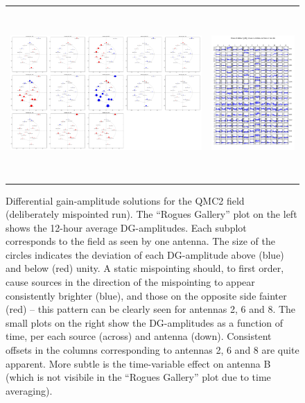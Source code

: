 \documentclass{aps2010} \special{papersize=8.5in,11in}
\begin{document}
\begin{figure}
\begin{tabular}{@{}cc@{}}
\includegraphics[height=6.5cm]{figures-meqtrees/dE_ant_gallery} &
\includegraphics[height=6.5cm,clip=true,trim=0cm 1cm 0cm 2cm]{figures-meqtrees/dE_mean} 
\end{tabular}
\caption{\label{fig:rogues}Differential gain-amplitude solutions for the QMC2 field (deliberately mispointed run). The ``Rogues Gallery'' plot on the left shows the 12-hour average DG-amplitudes. Each subplot corresponds to the field as seen by one antenna. The size of the circles indicates the deviation of each DG-amplitude above (blue) and below (red) unity. A static mispointing should, to first order, cause sources in the direction of the mispointing to appear consistently brighter (blue), and those on the opposite side fainter (red) -- this pattern can be clearly seen for antennas 2, 6 and 8. The small plots on the right show the DG-amplitudes as a function of time, per each source (across) and antenna (down). Consistent offsets in the columns corresponding to antennas 2, 6 and 8 are quite apparent. More subtle is the time-variable effect on antenna B (which is not visibile in the ``Rogues Gallery'' plot due to time averaging).
}
\end{figure}
\end{document}

